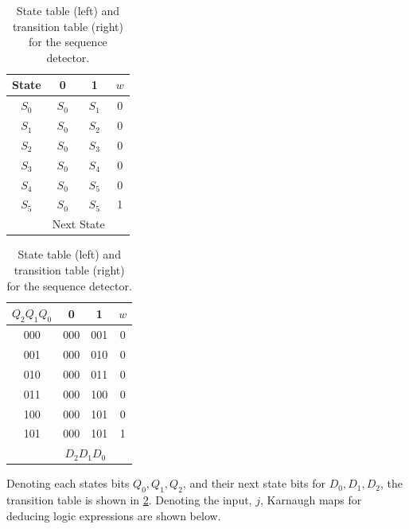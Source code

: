 \documentclass[../main.tex]{subfiles}
\begin{document}
\begin{table}[h]
    \centering
    \begin{minipage}{0.48\textwidth}
        \centering
        \begin{tabular}{|c|c c|c|}
            \hline
            \textbf{State} & 0 & 1 & $w$ \\
            \hline
            $S_0$ & $S_0$ & $S_1$ & 0 \\
            $S_1$ & $S_0$ & $S_2$ & 0 \\
            $S_2$ & $S_0$ & $S_3$ & 0 \\
            $S_3$ & $S_0$ & $S_4$ & 0 \\
            $S_4$ & $S_0$ & $S_5$ & 0 \\
            $S_5$ & $S_0$ & $S_5$ & 1 \\
            \hline
            & \multicolumn{2}{|c|}{Next State} & \\
            \hline
        \end{tabular}
    \end{minipage}%
    \hspace{0.01\textwidth}
    \begin{minipage}{0.48\textwidth}
        \centering
        \begin{tabular}{|c|c c|c|}
            \hline
            $Q_2 Q_1 Q_0$ & 0 & 1 & $w$ \\
            \hline
            000 & 000 & 001 & 0 \\
            001 & 000 & 010 & 0 \\
            010 & 000 & 011 & 0 \\
            011 & 000 & 100 & 0 \\
            100 & 000 & 101 & 0 \\
            101 & 000 & 101 & 1 \\
            \hline
            & \multicolumn{2}{|c|}{$D_2 D_1 D_0$} & \\
            \hline
        \end{tabular}
    \end{minipage}
    \caption{State table (left) and transition table (right) for the sequence detector.}
    \label{tab:q1}
\end{table}

\newpage

Denoting each states bits $Q_0, Q_1, Q_2$, and their next state bits for $D_0, D_1, D_2$, the transition table is shown in \ref{tab:q1}. Denoting the input, $j$, Karnaugh maps for deducing logic expressions are shown below.
\end{document}
